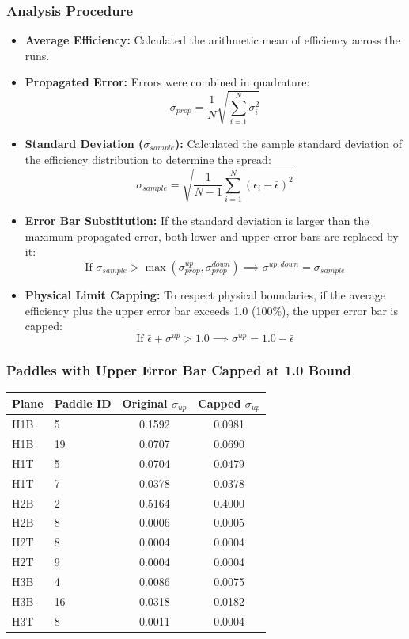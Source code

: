\documentclass[aspectratio=169]{beamer}
\begin{document}
\begin{frame}
    \frametitle{Analysis Procedure}
    \begin{itemize}
        \item \textbf{Average Efficiency:} Calculated the arithmetic mean of efficiency across the runs.
        \item \textbf{Propagated Error:} Errors were combined in quadrature:
        \[ \sigma_{prop} = \frac{1}{N} \sqrt{\sum_{i=1}^{N} \sigma_i^2} \]
        \item \textbf{Standard Deviation ($\sigma_{sample}$):} Calculated the sample standard deviation of the efficiency distribution to determine the spread:
        \[ \sigma_{sample} = \sqrt{\frac{1}{N-1} \sum_{i=1}^{N} (\epsilon_i - \bar{\epsilon})^2} \]
        \item \textbf{Error Bar Substitution:} If the standard deviation is larger than the maximum propagated error, both lower and upper error bars are replaced by it:
        \[ \text{If } \sigma_{sample} > \max(\sigma_{prop}^{up}, \sigma_{prop}^{down}) \implies \sigma^{up,down} = \sigma_{sample} \]
        \item \textbf{Physical Limit Capping:} To respect physical boundaries, if the average efficiency plus the upper error bar exceeds 1.0 (100\%), the upper error bar is capped:
        \[ \text{If } \bar{\epsilon} + \sigma^{up} > 1.0 \implies \sigma^{up} = 1.0 - \bar{\epsilon} \]
    \end{itemize}
\end{frame}

\begin{frame}
    \frametitle{Paddles with Upper Error Bar Capped at 1.0 Bound}
    \begin{table}
        \centering
        \begin{tabular}{llcc}
            \toprule
            \textbf{Plane} & \textbf{Paddle ID} & \textbf{Original $\sigma_{up}$} & \textbf{Capped $\sigma_{up}$} \\
            \midrule
            H1B & 5 & 0.1592 & 0.0981 \\
            H1B & 19 & 0.0707 & 0.0690 \\
            H1T & 5 & 0.0704 & 0.0479 \\
            H1T & 7 & 0.0378 & 0.0378 \\
            H2B & 2 & 0.5164 & 0.4000 \\
            H2B & 8 & 0.0006 & 0.0005 \\
            H2T & 8 & 0.0004 & 0.0004 \\
            H2T & 9 & 0.0004 & 0.0004 \\
            H3B & 4 & 0.0086 & 0.0075 \\
            H3B & 16 & 0.0318 & 0.0182 \\
            H3T & 8 & 0.0011 & 0.0004 \\
            \bottomrule
        \end{tabular}
    \end{table}
\end{frame}
\end{document}
